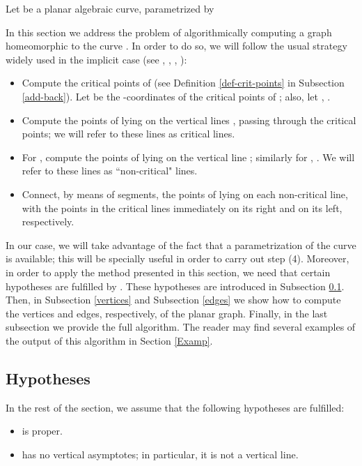 \documentclass{elsart}
\begin{document}
Let  be a planar algebraic curve,
parametrized by


In this section we address the problem of algorithmically
computing a graph  homeomorphic to the curve
. In order to do so, we will follow the usual
strategy widely used in the implicit case (see \cite{Eigen},
\cite{Lalo}, \cite{Hong}, \cite{seidel}):
\begin{itemize}
\item [(1)] Compute the critical points of 
(see Definition \ref{def-crit-points} in Subsection \ref{add-back}). Let  be the -coordinates of
the critical points of ; also, let , .
 \item [(2)] Compute the points of  lying on the
 vertical lines ,  passing through the critical points;
 we will refer to these lines as {\sf critical lines}.
 \item [(3)] For , compute the points of  lying on the vertical line ; similarly for , . We will refer to these lines as ``non-critical" lines.
 \item [(4)] Connect, by means of segments, the points of  lying on each non-critical line, with the points in the critical lines immediately
 on its right and on its left, respectively.
     \end{itemize}

In our case, we will take advantage of the fact that a parametrization of the curve is available; this will be specially useful in order to carry out step (4). Moreover, in order to apply the method presented in this section, we need that certain hypotheses are fulfilled by . These hypotheses are introduced in Subsection \ref{subsec-hyp}. Then, in Subsection \ref{vertices} and Subsection \ref{edges} we show how to compute the vertices and edges, respectively, of the planar graph. Finally, in the last subsection we provide the full algorithm. The reader may find
several examples of the output of this algorithm in Section \ref{Examp}.


\subsection{Hypotheses}\label{subsec-hyp}

In the rest of the section, we assume that the following hypotheses are fulfilled:

\begin{itemize}
\item [(i)]  is proper.
\item [(ii)]  has no vertical asymptotes; in particular, it is not a vertical line.
\end{itemize}
\end{document}
